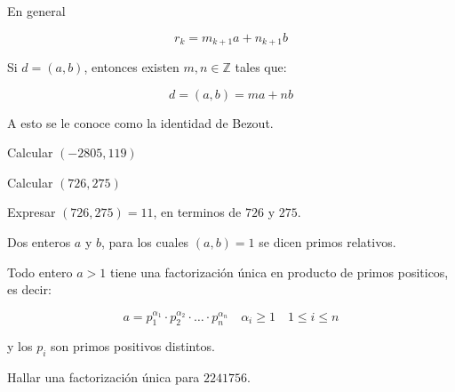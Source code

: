         En general

        \begin{equation}
            r_k = m_{k+1} a + n_{k+1} b
        \end{equation}

        \begin{teorema}
            Si $d = (a, b)$, entonces existen $m, n \in \mathbb{Z}$ tales que:

            \begin{equation}
                d = (a, b) = ma + nb
            \end{equation}

            A esto se le conoce como la identidad de Bezout.
        \end{teorema}

        \begin{ejemplo}
            Calcular $(-2805, 119)$
        \end{ejemplo}

        \begin{ejemplo}
            Calcular $(726, 275)$
        \end{ejemplo}

        \begin{ejemplo}
            Expresar $(726, 275) = 11$, en terminos de $726$ y $275$.
        \end{ejemplo}

        \begin{definicion}
            Dos enteros $a$ y $b$, para los cuales $(a, b) = 1$ se dicen primos relativos.
        \end{definicion}

        \begin{teorema}
            Todo entero $a > 1$ tiene una factorización única en producto de primos positicos, es decir:

            \begin{equation}
                a = p_1^{\alpha_1} \cdot p_2^{\alpha_2} \cdot \dots \cdot p_n^{\alpha_n} \quad \alpha_i \geq 1 \quad 1 \leq i \leq n
            \end{equation}

            y los $p_i$ son primos positivos distintos.
        \end{teorema}

        \begin{ejemplo}
            Hallar una factorización única para $2241756$.
        \end{ejemplo}

